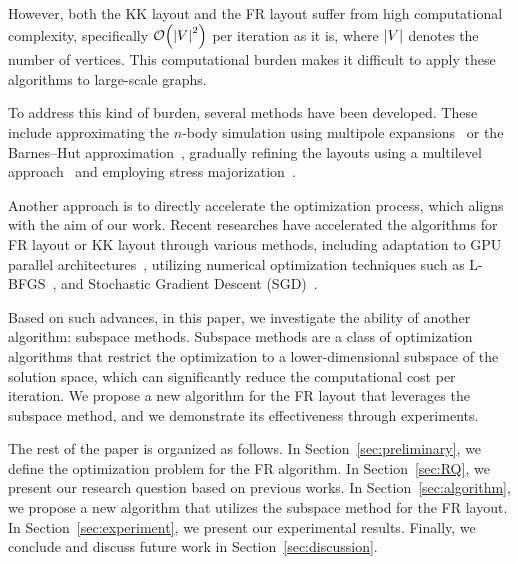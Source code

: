 \documentclass[dvipdfmx,lettersize,journal]{IEEEtran}
\begin{document}
However, both the KK layout and the FR layout suffer from high computational complexity, specifically $\order{\abs{V}^2}$ per iteration as it is, where $\abs{V}$ denotes the number of vertices. This computational burden makes it difficult to apply these algorithms to large-scale graphs.

To address this kind of burden, several methods have been developed. These include approximating the $n$-body simulation using multipole expansions~\cite{greengardFastAlgorithmParticle1987} or the Barnes--Hut approximation~\cite{barnesHierarchicalLogForcecalculation1986}, gradually refining the layouts using a multilevel approach~\cite{Hu2006EfficientHF} and employing stress majorization~\cite{gansnerGraphDrawingStress2005}.

Another approach is to directly accelerate the optimization process, which aligns with the aim of our work. Recent researches have accelerated the algorithms for FR layout or KK layout through various methods, including adaptation to GPU parallel architectures~\cite{gajdosParallelFruchtermanReingold2016}, utilizing numerical optimization techniques such as L-BFGS~\cite{6183577}, and Stochastic Gradient Descent (SGD)~\cite{8419285}.

Based on such advances, in this paper, we investigate the ability of another algorithm: subspace methods.
Subspace methods are a class of optimization algorithms that restrict the optimization to a lower-dimensional subspace of the solution space, which can significantly reduce the computational cost per iteration.
We propose a new algorithm for the FR layout that leverages the subspace method, and we demonstrate its effectiveness through experiments.

The rest of the paper is organized as follows.
In Section~\ref{sec:preliminary}, we define the optimization problem for the FR algorithm.
In Section~\ref{sec:RQ}, we present our research question based on previous works.
In Section~\ref{sec:algorithm}, we propose a new algorithm that utilizes the subspace method for the FR layout.
In Section~\ref{sec:experiment}, we present our experimental results.
Finally, we conclude and discuss future work in Section~\ref{sec:discussion}.
\end{document}
